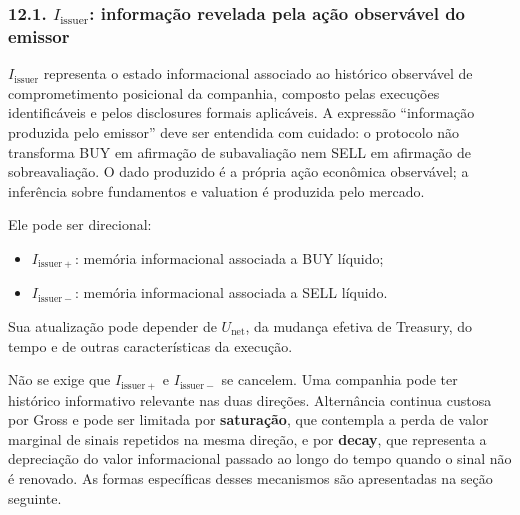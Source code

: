 \documentclass[
  a4paper,
]{article}
\providecommand{\tightlist}{%
  \setlength{\itemsep}{0pt}\setlength{\parskip}{0pt}}
\begin{document}
\hypertarget{12-1-i-issuer-informacao-produzida-pela-acao-divulgada-do-emissor}{}

\hypertarget{121-i_mathrmissuer-informauxe7uxe3o-revelada-pela-auxe7uxe3o-observuxe1vel-do-emissor}{%
\subsubsection{\texorpdfstring{12.1. \(I_{\mathrm{issuer}}\): informação
revelada pela ação observável do
emissor}{12.1. I\_\{\textbackslash mathrm\{issuer\}\}: informação revelada pela ação observável do emissor}}\label{121-i_mathrmissuer-informauxe7uxe3o-revelada-pela-auxe7uxe3o-observuxe1vel-do-emissor}}

\(I_{\mathrm{issuer}}\) representa o estado informacional associado ao
histórico observável de comprometimento posicional da companhia,
composto pelas execuções identificáveis e pelos disclosures formais
aplicáveis. A expressão ``informação produzida pelo emissor'' deve ser
entendida com cuidado: o protocolo não transforma BUY em afirmação de
subavaliação nem SELL em afirmação de sobreavaliação. O dado produzido é
a própria ação econômica observável; a inferência sobre fundamentos e
valuation é produzida pelo mercado.

Ele pode ser direcional:

\begin{itemize}
\tightlist
\item
  \textbf{\(I_{\mathrm{issuer}+}\)}: memória informacional associada a
  BUY líquido;
\item
  \textbf{\(I_{\mathrm{issuer}-}\)}: memória informacional associada a
  SELL líquido.
\end{itemize}

Sua atualização pode depender de \(U_{\mathrm{net}}\), da mudança
efetiva de Treasury, do tempo e de outras características da execução.

Não se exige que \(I_{\mathrm{issuer}+}\) e \(I_{\mathrm{issuer}-}\) se
cancelem. Uma companhia pode ter histórico informativo relevante nas
duas direções. Alternância continua custosa por Gross e pode ser
limitada por \textbf{saturação}, que contempla a perda de valor marginal
de sinais repetidos na mesma direção, e por \textbf{decay}, que
representa a depreciação do valor informacional passado ao longo do
tempo quando o sinal não é renovado. As formas específicas desses
mecanismos são apresentadas na seção seguinte.

\hypertarget{12-2-i-market-informacao-ja-disponivel-externamente}{}
\end{document}
